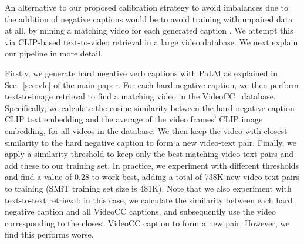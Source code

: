 \begin{table}
    \setlength{\tabcolsep}{8pt}
    \centering
        \vspace{0.2cm}
    \caption{
    \textbf{Video Mining.} We report multi-choice accuracy on Verb~\cite{park-etal-2022-exposing}, Kinetics-400 top-1 accuracy and V2T R@1 on Spoken Moment in Time (validation set of our pretraining SMiT data). We observe that although our Video Mining (VM) approach improves performance on Verb, it causes a drop in performance on Kinetics and SMiT, which highlights that the additional video-text pairs are noisy. For experiments including hard negatives, we note that one hard negative is sampled for each video here.}
    \label{tab:video-mining}
\end{table}

An alternative to our proposed calibration strategy to avoid imbalances due to the addition of negative captions would be to avoid training with unpaired data at all, by mining a matching video  for each generated caption . 
We attempt this via CLIP-based text-to-video retrieval in a large video database. We next explain our pipeline in more detail.

Firstly, we generate hard negative verb captions with PaLM as explained in Sec.~\ref{sec:vfc} of the main paper. For each hard negative caption, we then perform text-to-image retrieval to find a matching video in the VideoCC~\cite{nagrani2022learning} database. Specifically, we calculate the cosine similarity between the hard negative caption CLIP text embedding and the average of the video frames' CLIP image embedding, for all videos in the database. We then keep the video with closest similarity to the hard negative caption to form a new video-text pair.
Finally, we apply a similarity threshold to keep only the best matching video-text pairs and add these to our training set. In practice, we experiment with different thresholds and find a value of 0.28 to work best, adding a total of 738K new video-text pairs to training (SMiT training set size is 481K). Note that we also experiment with text-to-text retrieval: in this case, we calculate the similarity between each hard negative caption and all VideoCC captions, and subsequently use the video corresponding to the closest VideoCC caption to form a new pair. However, we find this performs worse.  

